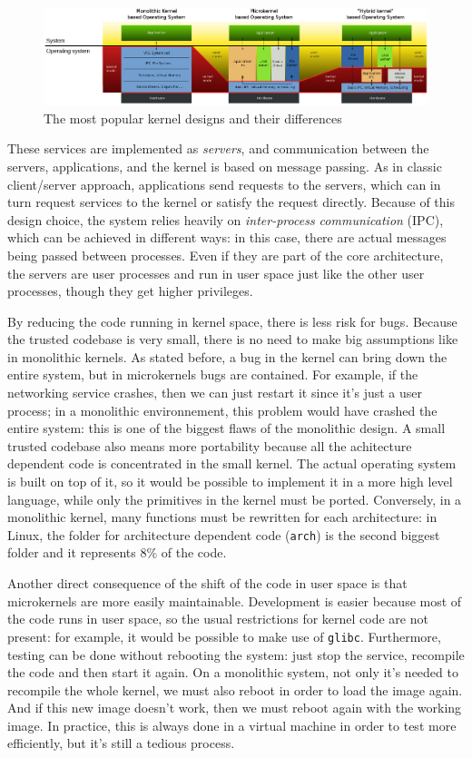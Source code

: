 \documentclass[10pt, oneside]{book}
\begin{document}
\begin{figure}[ht]
\includegraphics[width=\textwidth, keepaspectratio]{images/monolithic.png}
\caption{The most popular kernel designs and their differences}
\label{img:monolithic}
\end{figure}

These services are implemented as \textit{servers}, and communication between the servers, applications, and the kernel is based on message passing. As in classic client/server approach, applications send requests to the servers, which can in turn request services to the kernel or satisfy the request directly. Because of this design choice, the system relies heavily on \textit{inter-process communication} (IPC), which can be achieved in different ways: in this case, there are actual messages being passed between processes. Even if they are part of the core architecture, the servers are user processes and run in user space just like the other user processes, though they get higher privileges.

By reducing the code running in kernel space, there is less risk for bugs. Because the trusted codebase is very small, there is no need to make big assumptions like in monolithic kernels. As stated before, a bug in the kernel can bring down the entire system, but in microkernels bugs are contained. For example, if the networking service crashes, then we can just restart it since it's just a user process; in a monolithic environnement, this problem would have crashed the entire system: this is one of the biggest flaws of the monolithic design. A small trusted codebase also means more portability because all the achitecture dependent code is concentrated in the small kernel. The actual operating system is built on top of it, so it would be possible to implement it in a more high level language, while only the primitives in the kernel must be ported. Conversely, in a monolithic kernel, many functions must be rewritten for each architecture: in Linux, the folder for architecture dependent code (\verb|arch|) is the second biggest folder and it represents 8\% of the code.

Another direct consequence of the shift of the code in user space is that microkernels are more easily maintainable. Development is easier because most of the code runs in user space, so the usual restrictions for kernel code are not present: for example, it would be possible to make use of \verb|glibc|. Furthermore, testing can be done without rebooting the system: just stop the service, recompile the code and then start it again. On a monolithic system, not only it's needed to recompile the whole kernel, we must also reboot in order to load the image again. And if this new image doesn't work, then we must reboot again with the working image. In practice, this is always done in a virtual machine in order to test more efficiently, but it's still a tedious process.
\end{document}
